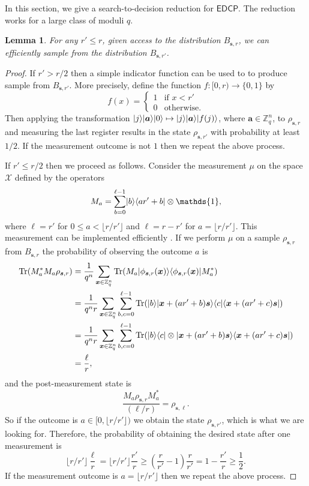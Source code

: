 \documentclass[11pt]{article}
\theoremstyle{plain}
\newtheorem{lemma}[theorem]{Lemma}
\theoremstyle{definition}
\DeclareMathOperator{\tr}{Tr} %
\DeclarePairedDelimiter{\ldbrac}{\lvert}{\rangle}
\DeclarePairedDelimiter{\rdbrac}{\langle}{\rvert}
\def\Z{\ensuremath{\mathbb{Z}}}
\def\edcp{\ensuremath{\mathsf{EDCP}}}
\begin{document}
In this section, we give a search-to-decision reduction for $\edcp$. The reduction works for a large class of moduli $q$.
\begin{lemma}
    \label{lem:small-r}
    For any $r' \le r$, given access to the distribution $B_{\bm{s}, r}$, we can efficiently sample from the distribution $B_{\bm{s}, r'}$. 
\end{lemma}
\begin{proof}
    If $r' > r / 2$ then a simple indicator function can be used to to produce sample from $B_{\bm{s}, r'}$. More precisely, define the function $f: [0, r) \rightarrow \{ 0, 1 \}$ by
    \[ f(x) = 
    \begin{cases}
        1 & \text{if } x < r' \\
        0 & \text{otherwise}.
    \end{cases} \]
    Then applying the transformation $\ldbrac{j}\ldbrac{\bm{a}}\ldbrac{0} \mapsto \ldbrac{j}\ldbrac{\bm{a}}\ldbrac{f(j)}$, where $\bm{a} \in \Z_q^n$, to $\rho_{\bm{s}, r}$ and measuring the last register results in the state $\rho_{\bm{s}, r'}$ with probability at least $1 / 2$. If the measurement outcome is not $1$ then we repeat the above process.

    If $r' \le r / 2$ then we proceed as follows. Consider the measurement $\mu$ on the space $\mathcal{X}$ defined by the operators
    \[ M_a = \sum_{b = 0}^{\ell - 1} \ldbrac{b}\rdbrac{ar' + b} \otimes \mathds{1}, \]
    where $\ell = r'$ for $0 \le a < \lfloor r / r'  \rfloor$ and $\ell = r - r'$ for $a = \lfloor r / r'  \rfloor$. This measurement can be implemented efficiently \cite{kaye2007introduction}. If we perform $\mu$ on a sample $\rho_{\bm{s}, r}$ from $B_{\bm{s}, r}$ the probability of observing the outcome $a$ is
    \begin{align*}
        \tr(M_a^*M_a \rho_{\bm{s}, r})
        & = \frac{1}{q^n} \sum_{\bm{x} \in \Z_q^n} \tr(M_a \ldbrac{\phi_{\bm{s}, r}(\bm{x})} \rdbrac{\phi_{\bm{s}, r}(\bm{x})} M_a^*) \\
        & = \frac{1}{q^nr} \sum_{\bm{x} \in \Z_q^n} \sum_{b, c = 0}^{\ell - 1} \tr(\ldbrac{b}\ldbrac{\bm{x} + (ar' + b)\bm{s}} \rdbrac{c}\rdbrac{\bm{x} + (ar' + c)\bm{s}}) \\
        & = \frac{1}{q^nr} \sum_{\bm{x} \in \Z_q^n} \sum_{b, c = 0}^{\ell - 1} \tr(\ldbrac{b}\rdbrac{c} \otimes \ldbrac{\bm{x} + (ar' + b)\bm{s}} \rdbrac{\bm{x} + (ar' + c)\bm{s}}) \\
        & = \frac{\ell}{r},
    \end{align*}
    and the post-measurement state is
    \[ \frac{M_a \rho_{\bm{s}, r} M_a^*}{(\ell / r)} = \rho_{\bm{s}, \ell}.  \]
    So if the outcome is $a \in [0, \lfloor r / r'  \rfloor)$ we obtain the state $\rho_{\bm{s}, r'}$, which is what we are looking for. Therefore, the probability of obtaining the desired state after one measurement is
    \[ \lfloor r / r' \rfloor \frac{\ell}{r} = \lfloor r / r' \rfloor \frac{r'}{r} \ge \left( \frac{r}{r'} - 1 \right)\frac{r}{r'} = 1 - \frac{r'}{r} \ge \frac{1}{2}. \]
    If the measurement outcome is $a = \lfloor r / r' \rfloor$ then we repeat the above process.
\end{proof}
\end{document}
